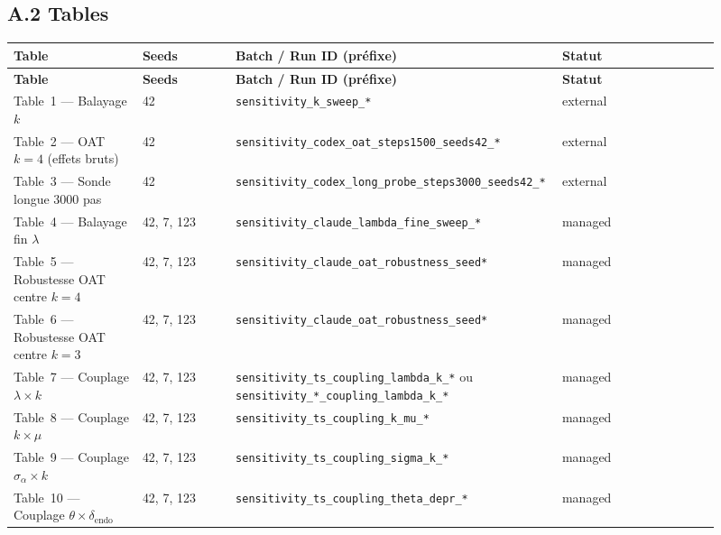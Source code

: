 \subsection*{A.2 Tables}

\begin{longtable}{p{0.18\linewidth}p{0.13\linewidth}p{0.38\linewidth}p{0.22\linewidth}}
\hline
\textbf{Table} & \textbf{Seeds} & \textbf{Batch / Run ID (préfixe)} & \textbf{Statut} \\
\hline
\endfirsthead
\hline
\textbf{Table} & \textbf{Seeds} & \textbf{Batch / Run ID (préfixe)} & \textbf{Statut} \\
\hline
\endhead
\hline
\endfoot

Table~1 — Balayage $k$
 & 42 & \texttt{sensitivity\_k\_sweep\_*} & external \\

Table~2 — OAT $k=4$ (effets bruts)
 & 42 & \texttt{sensitivity\_codex\_oat\_steps1500\_seeds42\_*} & external \\

Table~3 — Sonde longue 3000 pas
 & 42 & \texttt{sensitivity\_codex\_long\_probe\_steps3000\_seeds42\_*} & external \\

Table~4 — Balayage fin $\lambda$
 & 42, 7, 123 & \texttt{sensitivity\_claude\_lambda\_fine\_sweep\_*} & managed \\

Table~5 — Robustesse OAT centre $k=4$
 & 42, 7, 123 & \texttt{sensitivity\_claude\_oat\_robustness\_seed*} & managed \\

Table~6 — Robustesse OAT centre $k=3$
 & 42, 7, 123 & \texttt{sensitivity\_claude\_oat\_robustness\_seed*} & managed \\

Table~7 — Couplage $\lambda \times k$
 & 42, 7, 123 & \texttt{sensitivity\_ts\_coupling\_lambda\_k\_*} ou \texttt{sensitivity\_*\_coupling\_lambda\_k\_*} & managed \\

Table~8 — Couplage $k \times \mu$
 & 42, 7, 123 & \texttt{sensitivity\_ts\_coupling\_k\_mu\_*} & managed \\

Table~9 — Couplage $\sigma_\alpha \times k$
 & 42, 7, 123 & \texttt{sensitivity\_ts\_coupling\_sigma\_k\_*} & managed \\

Table~10 — Couplage $\theta \times \delta_{\mathrm{endo}}$
 & 42, 7, 123 & \texttt{sensitivity\_ts\_coupling\_theta\_depr\_*} & managed \\


\end{longtable}
